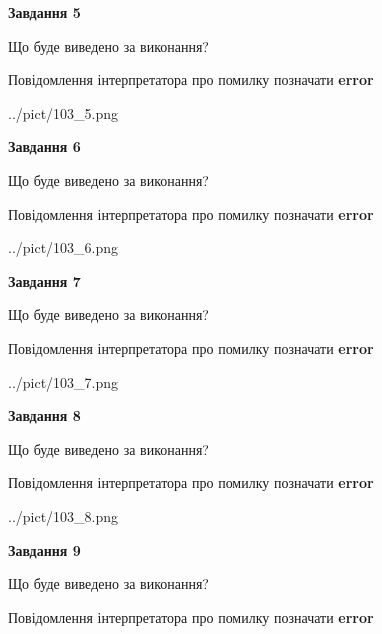 \documentclass[11pt, ukrainian]{article}
\begin{document}
{\begin {large}
{\begin {center}\textbf{Завдання 5}\end {center}}\par
Що буде виведено за виконання? \par
Повідомлення інтерпретатора про помилку позначати \textbf{error}

\begin{center}
	{../pict/103_5.png}
\end{center}
\newpage

{\begin {center}\textbf{Завдання 6}\end {center}}\par
Що буде виведено за виконання? \par
Повідомлення інтерпретатора про помилку позначати \textbf{error}

\begin{center}
	{../pict/103_6.png}
\end{center}
\newpage

{\begin {center}\textbf{Завдання 7}\end {center}}\par
Що буде виведено за виконання? \par
Повідомлення інтерпретатора про помилку позначати \textbf{error}

\begin{center}
	{../pict/103_7.png}
\end{center}
\newpage

{\begin {center}\textbf{Завдання 8}\end {center}}\par
Що буде виведено за виконання? \par
Повідомлення інтерпретатора про помилку позначати \textbf{error}

\begin{center}
	{../pict/103_8.png}
\end{center}
\newpage

{\begin {center}\textbf{Завдання 9}\end {center}}\par
Що буде виведено за виконання? \par
Повідомлення інтерпретатора про помилку позначати \textbf{error}


\end{large}}
\end{document}
